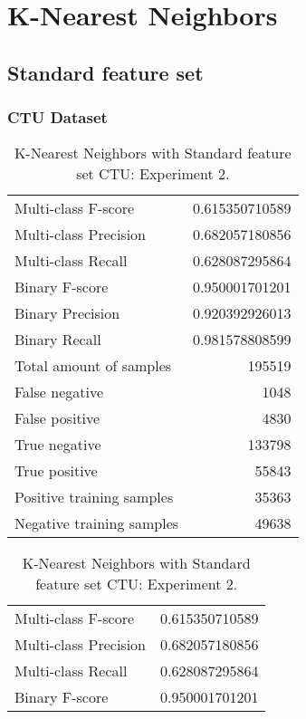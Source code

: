 
\chapter{K-Nearest Neighbors} %

\section{Standard feature set}
\subsection{CTU Dataset}

\begin{table}[H]
\begin{minipage}{0.5\textwidth}
\caption{K-Nearest Neighbors with Standard feature set CTU: Experiment 1.}
\centering
\begin{tabular}{l r}
\toprule
Multi-class F-score & 0.615350710589 \\
Multi-class Precision & 0.682057180856 \\
Multi-class Recall & 0.628087295864 \\
\midrule
Binary F-score & 0.950001701201 \\
Binary Precision & 0.920392926013 \\
Binary Recall & 0.981578808599 \\
\midrule
Total amount of samples & 195519 \\
False negative & 1048 \\
False positive & 4830 \\
True negative & 133798 \\
True positive & 55843 \\
\midrule
Positive training samples & 35363 \\
Negative training samples & 49638 \\
\bottomrule
\end{tabular}
\end{minipage}
\hfillx
\begin{minipage}{0.5\textwidth}
\caption{K-Nearest Neighbors with Standard feature set CTU: Experiment 2.}
\centering
\begin{tabular}{l r}
\toprule
Multi-class F-score & 0.615350710589 \\
Multi-class Precision & 0.682057180856 \\
Multi-class Recall & 0.628087295864 \\
\midrule
Binary F-score & 0.950001701201 \\

\end{tabular}
\end{minipage}
\end{table}
